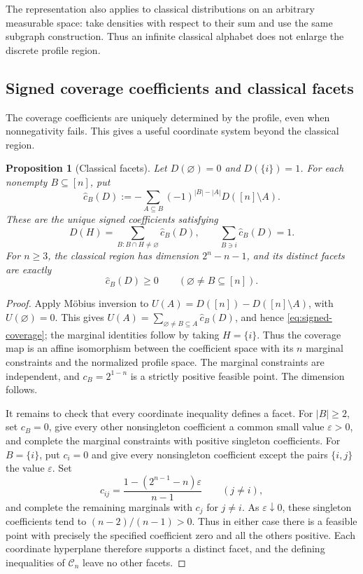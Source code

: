\documentclass[10pt,a4paper]{amsart}
\newtheorem{proposition}[theorem]{Proposition}
\newcommand{\1}{\mathbf 1}
\newcommand{\Coeff}{\mathcal C}
\begin{document}
The representation also applies to classical distributions on an arbitrary
measurable space: take densities with respect to their sum and use the same
subgraph construction. Thus an infinite classical alphabet does not enlarge
the discrete profile region.


\subsection{Signed coverage coefficients and classical facets}

The coverage coefficients are uniquely determined by the profile, even when
nonnegativity fails. This gives a useful coordinate system beyond the
classical region.

\begin{proposition}[Classical facets]\label{prop:all-classical-facets}
Let $D(\varnothing)=0$ and $D(\{i\})=1$. For each nonempty $B\subseteq[n]$, put
\begin{equation}\label{eq:signed-coefficients}
 \widehat c_B(D):=-\sum_{A\subseteq B}(-1)^{|B|-|A|}D([n]\setminus A).
\end{equation}
These are the unique signed coefficients satisfying
\begin{equation}\label{eq:signed-coverage}
 D(H)=\sum_{B:B\cap H\ne\varnothing}\widehat c_B(D),\qquad
 \sum_{B\ni i}\widehat c_B(D)=1.
\end{equation}
For $n\ge3$, the classical region has dimension $2^n-n-1$, and its distinct
facets are exactly
\begin{equation}\label{eq:classical-facets-all}
 \widehat c_B(D)\ge0\qquad(\varnothing\ne B\subseteq[n]).
\end{equation}
\end{proposition}
\begin{proof}
Apply M\"obius inversion to $U(A)=D([n])-D([n]\setminus A)$, with
$U(\varnothing)=0$. This gives
$U(A)=\sum_{\varnothing\ne B\subseteq A}\widehat c_B(D)$, and hence
\eqref{eq:signed-coverage}; the marginal identities follow by taking
$H=\{i\}$. Thus the coverage map is an affine isomorphism between the
coefficient space with its $n$ marginal constraints and the normalized profile
space. The marginal constraints are independent, and $c_B=2^{1-n}$ is a
strictly positive feasible point. The dimension follows.

It remains to check that every coordinate inequality defines a facet.
For $|B|\ge2$, set $c_B=0$, give every other nonsingleton coefficient a common
small value $\varepsilon>0$, and complete the marginal constraints with
positive singleton coefficients. For $B=\{i\}$, put $c_i=0$ and give every
nonsingleton coefficient except the pairs $\{i,j\}$ the value $\varepsilon$.
Set
\[
 c_{ij}=\frac{1-(2^{n-1}-n)\varepsilon}{n-1}\qquad(j\ne i),
\]
and complete the remaining marginals with $c_j$ for $j\ne i$.
As $\varepsilon\downarrow0$, these singleton coefficients tend to
$(n-2)/(n-1)>0$. Thus in either case there is a feasible point with precisely
the specified coefficient zero and all the others positive. Each coordinate
hyperplane therefore supports a distinct facet, and the defining
inequalities of $\Coeff_n$ leave no other facets.
\end{proof}
\end{document}
